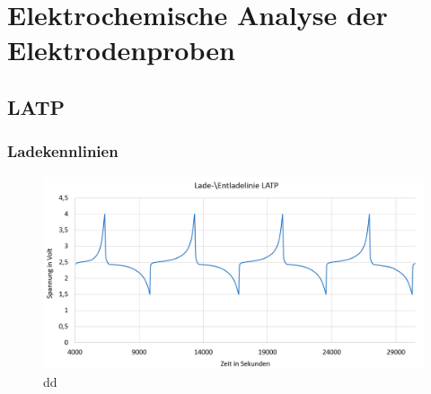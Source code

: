 \documentclass[a4paper, 11pt, headsepline,footsepline,twoside,abstract]{scrbook}
\begin{document}
\section{Elektrochemische Analyse der Elektrodenproben}
\subsection{LATP}
\subsubsection{Ladekennlinien}
\begin{figure}
	\centering
	\includegraphics[width=1.0\columnwidth]{images/Ladelinie_LATP.png}
	\caption{dd}
	\label{ladelinie_LATP}
\end{figure}
\end{document}
